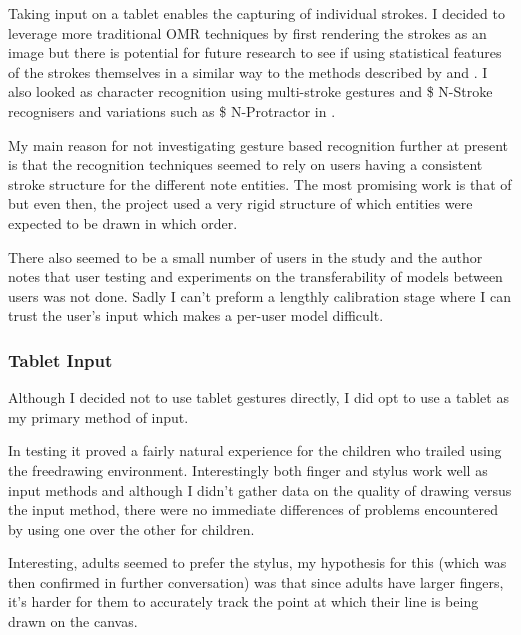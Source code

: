Taking input on a tablet enables the capturing of individual strokes. I decided to leverage more traditional OMR techniques by first rendering the strokes as an image but there is potential for future research to see if using statistical features of the strokes themselves in a similar way to the methods described by \cite{taubman2005musichand} and \cite{george2003online}. I also looked as character recognition using multi-stroke gestures and \$ N-Stroke recognisers and variations such as \$ N-Protractor in \cite{anthony2012n}.

My main reason for not investigating gesture based recognition further at present is that the recognition techniques seemed to rely on users having a consistent stroke structure for the different note entities. The most promising work is that of \cite{taubman2005musichand} but even then, the project used a very rigid structure of which entities were expected to be drawn in which order.

There also seemed to be a small number of users in the \cite{taubman2005musichand} study and the author notes that user testing and experiments on the transferability of models between users was not done. Sadly I can't preform a lengthly calibration stage where I can trust the user's input which makes a per-user model difficult.

\subsubsection{Tablet Input}

Although I decided not to use tablet gestures directly, I did opt to use a tablet as my primary method of input.

In testing it proved a fairly natural experience for the children who trailed \noteED using the freedrawing environment. Interestingly both finger and stylus work well as input methods and although I didn't gather data on the quality of drawing versus the input method, there were no immediate differences of problems encountered by using one over the other for children.

Interesting, adults seemed to prefer the stylus, my hypothesis for this (which was then confirmed in further conversation) was that since adults have larger fingers, it's harder for them to accurately track the point at which their line is being drawn on the canvas.

